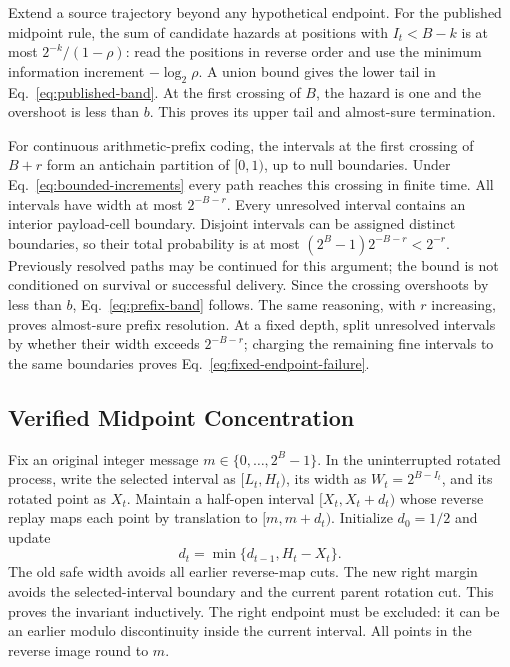 Extend a source trajectory beyond any hypothetical endpoint. For the published
midpoint rule, the sum of candidate hazards at positions with $I_t<B-k$ is
at most $2^{-k}/(1-\rho)$: read the positions in reverse order and use the
minimum information increment $-\log_2\rho$. A union bound gives the lower
tail in Eq.~\eqref{eq:published-band}. At the first crossing of $B$, the hazard
is one and the overshoot is less than $b$. This proves its upper tail and
almost-sure termination.

For continuous arithmetic-prefix coding, the intervals at the first crossing
of $B+r$ form an antichain partition of $[0,1)$, up to null boundaries. Under
Eq.~\eqref{eq:bounded-increments} every path reaches this crossing in finite
time. All intervals have width at most $2^{-B-r}$. Every unresolved interval
contains an interior payload-cell boundary. Disjoint intervals can be assigned
distinct boundaries, so their total probability is at most
$(2^B-1)2^{-B-r}<2^{-r}$. Previously resolved paths may be continued for this
argument; the bound is not conditioned on survival or successful delivery.
Since the crossing overshoots by less than $b$, Eq.~\eqref{eq:prefix-band}
follows. The same reasoning, with $r$ increasing, proves almost-sure prefix
resolution. At a fixed depth, split unresolved intervals by whether their
width exceeds $2^{-B-r}$; charging the remaining fine intervals to the same
boundaries proves Eq.~\eqref{eq:fixed-endpoint-failure}.

\subsection{Verified Midpoint Concentration}
\label{app:verified-proof}

Fix an original integer message $m\in\{0,\ldots,2^B-1\}$. In the uninterrupted
rotated process, write the selected interval as $[L_t,H_t)$, its width as
$W_t=2^{B-I_t}$, and its rotated point as $X_t$. Maintain a half-open interval
$[X_t,X_t+d_t)$ whose reverse replay maps each point by translation to
$[m,m+d_t)$. Initialize $d_0=1/2$ and update
\begin{equation}
 d_t=\min\{d_{t-1},H_t-X_t\}.
 \label{eq:safe-width}
\end{equation}
The old safe width avoids all earlier reverse-map cuts. The new right margin
avoids the selected-interval boundary and the current parent rotation cut.
This proves the invariant inductively. The right endpoint must be excluded:
it can be an earlier modulo discontinuity inside the current interval.
All points in the reverse image round to $m$.

